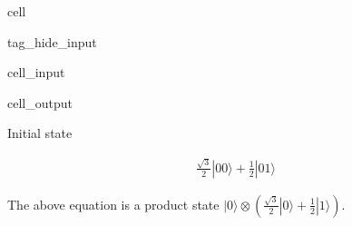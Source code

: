 \documentclass[letterpaper,10pt,english]{jupyterBook}
\begin{document}
\begin{sphinxuseclass}{cell}
\begin{sphinxuseclass}{tag_hide_input}\begin{sphinxVerbatimInput}

\begin{sphinxuseclass}{cell_input}
\begin{sphinxVerbatim}[commandchars=\\\{\}]
\end{sphinxVerbatim}

\end{sphinxuseclass}\end{sphinxVerbatimInput}
\begin{sphinxVerbatimOutput}

\begin{sphinxuseclass}{cell_output}
\begin{sphinxVerbatim}[commandchars=\\\{\}]
Initial state
\end{sphinxVerbatim}
\begin{equation*}
\begin{split}\frac{\sqrt{3}}{2} |00\rangle+\frac{1}{2} |01\rangle\end{split}
\end{equation*}
\end{sphinxuseclass}\end{sphinxVerbatimOutput}

\end{sphinxuseclass}
\end{sphinxuseclass}
\sphinxAtStartPar
The above equation is a product state \(|0\rangle \otimes \left(\frac{\sqrt{3}}{2}|0\rangle + \frac{1}{2}|1\rangle\right)\).
\end{document}
